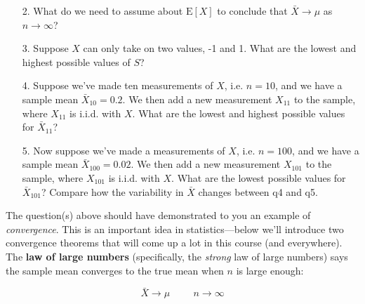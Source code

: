 \documentclass[10pt]{extarticle}
\newcommand{\E}{\text{E}}
\begin{document}
\begin{itemize}
		
	\item[2.] What do we need to assume about $\E[X]$ to conclude that $\bar X \rightarrow \mu$ as $n \rightarrow \infty$? \\ 

	\item[3.] Suppose $X$ can only take on two values, -1 and 1. What are the lowest and highest possible values of $S$? \\ 

	\item[4.] Suppose we've made ten measurements of $X$, i.e. $n=10$, and we have a sample mean $\bar X_{10} = 0.2$. We then add a new measurement $X_{11}$ to the sample, where $X_{11}$ is i.i.d. with $X$. What are the lowest and highest possible values for $\bar X_{11}$? \\ 

	\item[5.] Now suppose we've made a {\hundred} measurements of $X$, i.e. $n=100$, and we have a sample mean $\bar X_{100} = 0.02$. We then add a new measurement $X_{101}$ to the sample, where $X_{101}$ is i.i.d. with $X$. What are the lowest possible values for $\bar X_{101}$? Compare how the variability in $\bar X$ changes between q4 and q5.  

\end{itemize}

\hfill 

The question(s) above should have demonstrated to you an example of {\it convergence}. This is an important idea in statistics---below we'll introduce two convergence theorems that will come up a lot in this course (and everywhere). \\  

The {\bf law of large numbers} (specifically, the {\it strong} law of large numbers) says the sample mean converges to the true mean when $n$ is large enough:

$$\bar X \longrightarrow \mu \hspace{1cm} n \longrightarrow \infty$$ 

\hfill 
\end{document}
